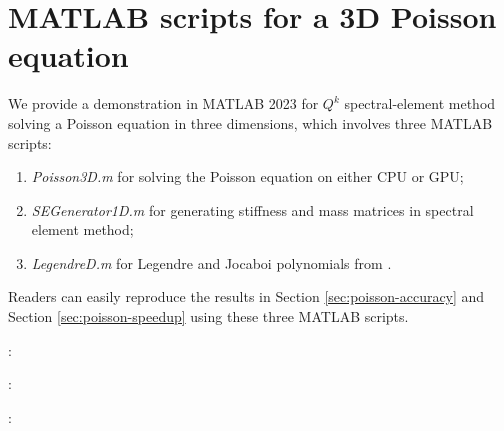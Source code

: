 \documentclass{article}
\begin{document}
\section{MATLAB scripts for a 3D Poisson equation}
\label{sec:appendix}
We provide a demonstration in MATLAB 2023  for $Q^k$ spectral-element method solving a Poisson equation in three dimensions, which involves three MATLAB scripts:
\begin{enumerate}
  \item   {\it Poisson3D.m} for solving the Poisson equation  on either CPU or GPU; 
  \item {\it SEGenerator1D.m} for generating stiffness and mass matrices in spectral element method;
\item  {\it LegendreD.m} for  Legendre and Jocaboi polynomials from \cite{hesthaven2007nodal}.
\end{enumerate}
Readers can easily reproduce the results in Section \ref{sec:poisson-accuracy} and Section \ref{sec:poisson-speedup} using these three MATLAB  scripts.

\newpage
{}:
\vspace{-0.5cm}



 \newpage
 :

\newpage

 :

 



 

\end{document}
